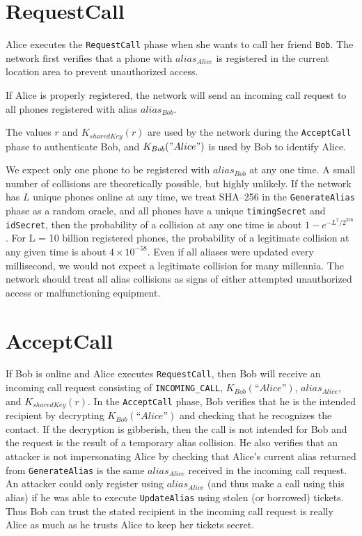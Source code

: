 \documentclass[11pt]{article}
\begin{document}
\section{RequestCall}
Alice executes the \texttt{RequestCall} phase when she wants to call her friend \texttt{Bob}. The network first verifies that a phone with $alias_{Alice}$ is registered in the current location area to prevent unauthorized access.

If Alice is properly registered, the network will send an incoming call request to all phones registered with alias $alias_{Bob}$.

The values $r$ and $K_{sharedKey}(r)$ are used by the network during the \texttt{AcceptCall} phase to authenticate Bob, and $K_{Bob}("Alice")$ is used by Bob to identify Alice. 

We expect only one phone to be registered with $alias_{Bob}$ at any one time. A small number of collisions are theoretically possible, but highly unlikely. If the network has $L$ unique phones online at any time, we treat SHA--256 in the \texttt{GenerateAlias} phase as a random oracle, and all phones have a unique \texttt{timingSecret} and \texttt{idSecret}, then the probability of a collision at any one time is about $1 - e^{-L^2/2^{256}}$. For L = 10 billion registered phones, the probability of a legitimate collision at any given time is about $4 \times 10^{-58}$. Even if all aliases were updated every millisecond, we would not expect a legitimate collision for many millennia. The network should treat all alias collisions as signs of either attempted unauthorized access or malfunctioning equipment.


\section{AcceptCall}

If Bob is online and Alice executes \texttt{RequestCall}, then Bob will receive an incoming call request consisting of \texttt{INCOMING_CALL}, $K_{Bob}(“Alice”)$, $alias_{Alice}$, and $K_{sharedKey}(r)$. In the \texttt{AcceptCall} phase, Bob verifies that he is the intended recipient by decrypting $K_{Bob}(“Alice”)$ and checking that he recognizes the contact. If the decryption is gibberish, then the call is not intended for Bob and the request is the result of a temporary alias collision. He also verifies that an attacker is not impersonating Alice by checking that Alice's current alias returned from \texttt{GenerateAlias} is the same $alias_{Alice}$ received in the incoming call request. An attacker could only register using $alias_{Alice}$ (and thus make a call using this alias) if he was able to execute \texttt{UpdateAlias} using stolen (or borrowed) tickets. Thus Bob can trust the stated recipient in the incoming call request is really Alice as much as he trusts Alice to keep her tickets secret. 
\end{document}
